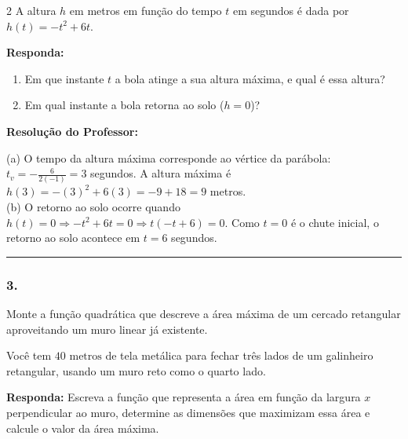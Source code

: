 \begin{multicols*}{2}
A altura $h$ em metros em função do tempo $t$ em segundos é dada por $h(t) = -t^2 + 6t$.
\begin{boxresponda}
\textbf{Responda:} 
\begin{enumerate}[label=\alph*), itemsep=\espacoAlt]
\item Em que instante $t$ a bola atinge a sua altura máxima, e qual é essa altura?
\item Em qual instante a bola retorna ao solo ($h = 0$)?
\end{enumerate}
\end{boxresponda}

\ifgabarito
    \begin{tcolorbox}[colback=CorTitUm!5, colframe=CorTitUm, boxrule=1pt, arc=4pt, left=6pt, right=6pt, top=6pt, bottom=6pt]
    \small\textbf{\textcolor{CorTitUm}{Resolução do Professor:}}\par\vspace{0.1cm}
    \color{CinzaEscuro}
    (a) O tempo da altura máxima corresponde ao vértice da parábola: $t_v = -\frac{6}{2(-1)} = 3$ segundos. A altura máxima é $h(3) = -(3)^2 + 6(3) = -9 + 18 = 9$ metros. \\
    (b) O retorno ao solo ocorre quando $h(t) = 0 \Rightarrow -t^2 + 6t = 0 \Rightarrow t(-t + 6) = 0$. Como $t=0$ é o chute inicial, o retorno ao solo acontece em $t = 6$ segundos.
    \end{tcolorbox}
\fi

\par\vspace{\espacoQuestao}

\noindent\textcolor{CorLinha}{\rule{\linewidth}{0.5pt}} 
\par\vspace{\espacoPreQuestao}
\subsubsection*{3.} Monte a função quadrática que descreve a área máxima de um cercado retangular aproveitando um muro linear já existente.

Você tem $40\text{ metros}$ de tela metálica para fechar três lados de um galinheiro retangular, usando um muro reto como o quarto lado.
\begin{boxresponda}
\textbf{Responda:} Escreva a função que representa a área em função da largura $x$ perpendicular ao muro, determine as dimensões que maximizam essa área e calcule o valor da área máxima.
\end{boxresponda}


\end{multicols*}
